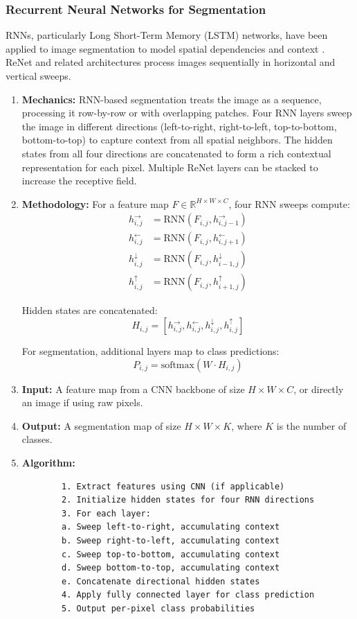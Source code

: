 \documentclass[conference]{IEEEtran}
\begin{document}
\subsubsection{Recurrent Neural Networks for Segmentation}
RNNs, particularly Long Short-Term Memory (LSTM) networks, have been applied to image segmentation to model spatial dependencies and context \cite{visin2015rnn}. ReNet and related architectures process images sequentially in horizontal and vertical sweeps.

\begin{enumerate}
	\item \textbf{Mechanics:}
	RNN-based segmentation treats the image as a sequence, processing it row-by-row or with overlapping patches. Four RNN layers sweep the image in different directions (left-to-right, right-to-left, top-to-bottom, bottom-to-top) to capture context from all spatial neighbors. The hidden states from all four directions are concatenated to form a rich contextual representation for each pixel. Multiple ReNet layers can be stacked to increase the receptive field.
	
	\item \textbf{Methodology:}
	For a feature map $F \in \mathbb{R}^{H \times W \times C}$, four RNN sweeps compute:
	\begin{align*}
		h_{i,j}^{\rightarrow} &= \text{RNN}(F_{i,j}, h_{i,j-1}^{\rightarrow}) \\
		h_{i,j}^{\leftarrow} &= \text{RNN}(F_{i,j}, h_{i,j+1}^{\leftarrow}) \\
		h_{i,j}^{\downarrow} &= \text{RNN}(F_{i,j}, h_{i-1,j}^{\downarrow}) \\
		h_{i,j}^{\uparrow} &= \text{RNN}(F_{i,j}, h_{i+1,j}^{\uparrow})
	\end{align*}
	
	Hidden states are concatenated:
	\[
	H_{i,j} = [h_{i,j}^{\rightarrow}, h_{i,j}^{\leftarrow}, h_{i,j}^{\downarrow}, h_{i,j}^{\uparrow}]
	\]
	
	For segmentation, additional layers map to class predictions:
	\[
	P_{i,j} = \text{softmax}(W \cdot H_{i,j})
	\]
	
	\item \textbf{Input:}
	A feature map from a CNN backbone of size $H \times W \times C$, or directly an image if using raw pixels.
	
	\item \textbf{Output:}
	A segmentation map of size $H \times W \times K$, where $K$ is the number of classes.
	
	\item \textbf{Algorithm:}
	\begin{lstlisting}
		1. Extract features using CNN (if applicable)
		2. Initialize hidden states for four RNN directions
		3. For each layer:
		a. Sweep left-to-right, accumulating context
		b. Sweep right-to-left, accumulating context
		c. Sweep top-to-bottom, accumulating context
		d. Sweep bottom-to-top, accumulating context
		e. Concatenate directional hidden states
		4. Apply fully connected layer for class prediction
		5. Output per-pixel class probabilities
	\end{lstlisting}
\end{enumerate}
\end{document}
